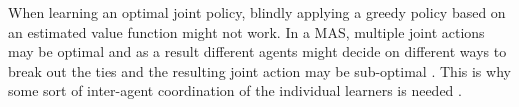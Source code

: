 

When learning an optimal joint policy, blindly applying a greedy policy based on an estimated value function might not work. In a MAS, multiple joint actions may be optimal and as a result different agents might decide on different ways to break out the ties and the resulting joint action may be sub-optimal \cite{busoniu_multi-agent_2010}. This is why some sort of inter-agent coordination of the individual learners is needed \cite{busoniu_decentralized_2007}.



 
